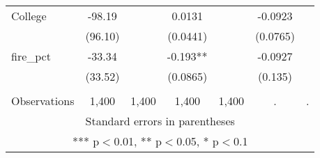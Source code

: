 \begin{tabular}{lcccccc}
College & -98.19 &  & 0.0131 &  & -0.0923 &  \\
 & (96.10) &  & (0.0441) &  & (0.0765) &  \\
fire\_pct & -33.34 &  & -0.193** &  & -0.0927 &  \\
 & (33.52) &  & (0.0865) &  & (0.135) &  \\
 &  &  &  &  &  &  \\
 Observations & 1,400 & 1,400 & 1,400 & 1,400 & . & . \\ \hline
\multicolumn{7}{c}{ Standard errors in parentheses} \\
\multicolumn{7}{c}{ *** p$<$0.01, ** p$<$0.05, * p$<$0.1} \\
\end{tabular}
